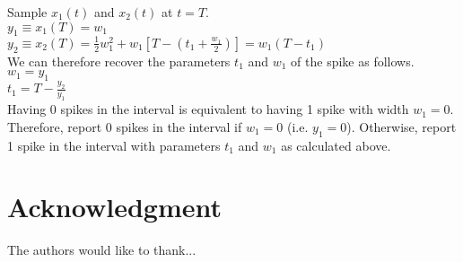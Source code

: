 \documentclass[journal]{IEEEtran}
\begin{document}
\noindent Sample $x_1(t)$ and $x_2(t)$ at $t = T$.\\

$y_1 \equiv x_1(T) = w_1$\\

$y_2 \equiv x_2(T) = \frac{1}{2}w_1^2 + w_1[T - (t_1+\frac{w_1}{2})] = w_1(T-t_1)$\\

\noindent We can therefore recover the parameters $t_1$ and $w_1$ of the spike as follows.\\

$w_1 = y_1$\\

$t_1 = T - \frac{y_2}{y_1}$\\

Having 0 spikes in the interval is equivalent to having 1 spike with width $w_1 = 0$. Therefore, report 0 spikes in the interval if $w_1 = 0$ (i.e. $y_1 = 0$). Otherwise, report 1 spike in the interval with parameters $t_1$ and $w_1$ as calculated above.



\section*{Acknowledgment}

The authors would like to thank...


\ifCLASSOPTIONcaptionsoff
  \newpage
\fi





%
%
%
\end{document}

